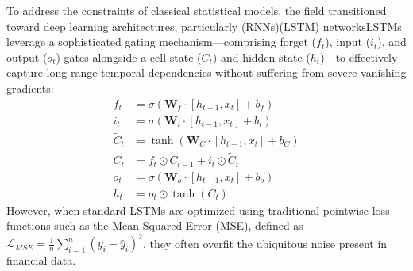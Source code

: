 To address the constraints of classical statistical models, the field transitioned toward deep learning architectures, particularly (RNNs)(LSTM) networksLSTMs leverage a sophisticated gating mechanism—comprising forget ($f_t$), input ($i_t$), and output ($o_t$) gates alongside a cell state ($C_t$) and hidden state ($h_t$)—to effectively capture long-range temporal dependencies without suffering from severe vanishing gradients:
\begin{align}
f_t &= \sigma(\mathbf{W}_f \cdot[h_{t-1}, x_t] + b_f) \\
i_t &= \sigma(\mathbf{W}_i \cdot [h_{t-1}, x_t] + b_i) \\
\tilde{C}_t &= \tanh(\mathbf{W}_C \cdot[h_{t-1}, x_t] + b_C) \\
C_t &= f_t \odot C_{t-1} + i_t \odot \tilde{C}_t \\
o_t &= \sigma(\mathbf{W}_o \cdot [h_{t-1}, x_t] + b_o) \\
h_t &= o_t \odot \tanh(C_t)
\end{align}
However, when standard LSTMs are optimized using traditional pointwise loss functions such as the Mean Squared Error (MSE), defined as $\mathcal{L}_{MSE} = \frac{1}{n} \sum_{i=1}^n (y_i - \hat{y}_i)^2$, they often overfit the ubiquitous noise present in financial data.

